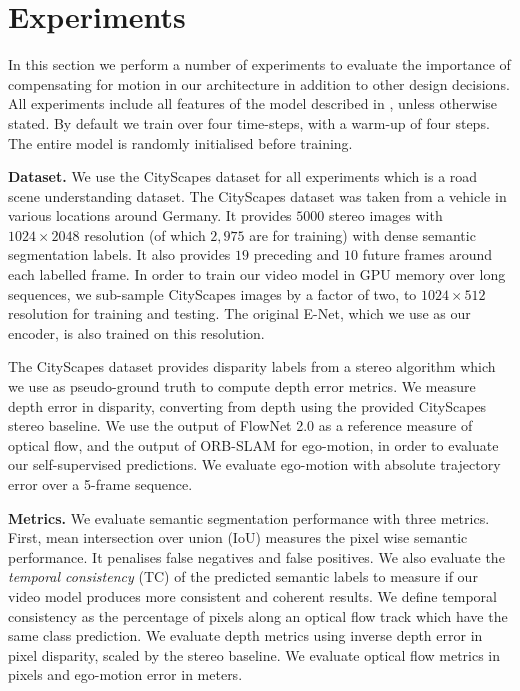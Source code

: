 \section{Experiments}

In this section we perform a number of experiments to evaluate the importance of compensating for motion in our architecture in addition to other design decisions. All experiments include all features of the model described in , unless otherwise stated. By default we train over four time-steps, with a warm-up of four steps. The entire model is randomly initialised before training.

\textbf{Dataset.} We use the CityScapes dataset for all experiments \citep{Cordts2016Cityscapes} which is a road scene understanding dataset. The CityScapes dataset was taken from a vehicle in various locations around Germany. It provides $5000$ stereo images with $1024 \times 2048$ resolution (of which $2,975$ are for training) with dense semantic segmentation labels. It also provides $19$ preceding and $10$ future frames around each labelled frame.
In order to train our video model in GPU memory over long sequences, we sub-sample CityScapes images by a factor of two, to $1024\times 512$ resolution for training and testing. The original E-Net, which we use as our encoder, is also trained on this resolution.

The CityScapes dataset provides disparity labels from a stereo algorithm \citep{Cordts2016Cityscapes} which we use as pseudo-ground truth to compute depth error metrics. We measure depth error in disparity, converting from depth using the provided CityScapes stereo baseline. We use the output of FlowNet 2.0 \citep{flownet2} as a reference measure of optical flow, and the output of ORB-SLAM \citep{mur2015orb} for ego-motion, in order to evaluate our self-supervised predictions. We evaluate ego-motion with absolute trajectory error over a 5-frame sequence.

\textbf{Metrics.} We evaluate semantic segmentation performance with three metrics. First, mean intersection over union (IoU) measures the pixel wise semantic performance. It penalises false negatives and false positives. We also evaluate the \textit{temporal consistency} (TC) of the predicted semantic labels to measure if our video model produces more consistent and coherent results. We define temporal consistency as the percentage of pixels along an optical flow track which have the same class prediction. We evaluate depth metrics using inverse depth error in pixel disparity, scaled by the stereo baseline. We evaluate optical flow metrics in pixels and ego-motion error in meters.

